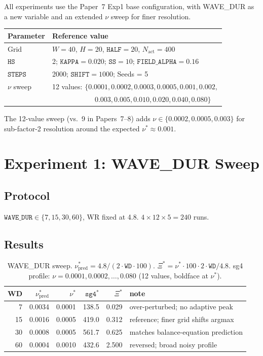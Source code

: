 \documentclass[11pt]{article}
\theoremstyle{remark}
\begin{document}
All experiments use the Paper~7 Exp1 base configuration, with WAVE\_DUR as a
new variable and an extended $\nu$ sweep for finer resolution.

\begin{center}
\begin{tabular}{ll}
\toprule
Parameter & Reference value \\
\midrule
Grid & $W=40$, $H=20$, $\mathtt{HALF}=20$, $N_{\text{act}}=400$ \\
$\mathtt{HS}$ & 2; $\mathtt{KAPPA}=0.020$; $\mathtt{SS}=10$; $\mathtt{FIELD\_ALPHA}=0.16$ \\
$\mathtt{STEPS}$ & 2000; $\mathtt{SHIFT}=1000$; Seeds = 5 \\
$\nu$ sweep & 12 values: $\{0.0001, 0.0002, 0.0003, 0.0005, 0.001, 0.002,$ \\
            & $\quad\quad\quad\quad\quad\quad 0.003, 0.005, 0.010, 0.020, 0.040, 0.080\}$ \\
\bottomrule
\end{tabular}
\end{center}

The 12-value sweep (vs.\ 9 in Papers~7--8) adds $\nu \in \{0.0002, 0.0005, 0.003\}$
for sub-factor-2 resolution around the expected $\nu^* \approx 0.001$.

\section{Experiment 1: WAVE\_DUR Sweep}
\label{sec:exp1}

\subsection{Protocol}

$\mathtt{WAVE\_DUR} \in \{7, 15, 30, 60\}$, WR fixed at 4.8. $4 \times 12 \times
5 = 240$ runs.

\subsection{Results}

\begin{table}[h]
\centering
\caption{WAVE\_DUR sweep. $\nu^*_{\text{pred}} = 4.8/(2 \cdot \mathtt{WD} \cdot 100)$.
$\Xi^* = \nu^* \cdot 100 \cdot 2 \cdot \mathtt{WD}/4.8$.
sg4 profile: $\nu = 0.0001, 0.0002, \ldots, 0.080$ (12 values, boldface at $\nu^*$).}
\label{tab:exp1}
\begin{tabular}{r r r r r l}
\toprule
WD & $\nu^*_{\text{pred}}$ & $\nu^*$ & $\mathtt{sg4}^*$ & $\Xi^*$ & note \\
\midrule
 7 & 0.0034 & 0.0001 & 138.5 & 0.029 & over-perturbed; no adaptive peak \\
15 & 0.0016 & 0.0005 & 419.0 & 0.312 & reference; finer grid shifts argmax \\
30 & 0.0008 & 0.0005 & 561.7 & 0.625 & matches balance-equation prediction \\
60 & 0.0004 & 0.0010 & 432.6 & 2.500 & reversed; broad noisy profile \\
\bottomrule
\end{tabular}
\end{table}
\end{document}

